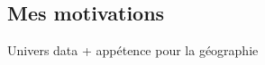 \begin{center}
\subsection*{Mes motivations}
\end{center}

\hskip7mm

\begin{spacing}{1.3}
Univers data + appétence pour la géographie

\vspace{5mm}


\vspace{5mm}


\end{spacing}